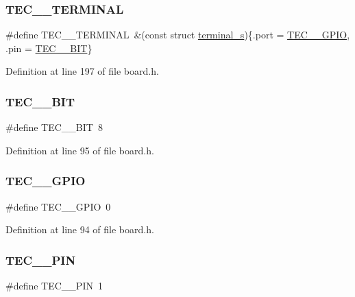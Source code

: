 \subsubsection{\texorpdfstring{T\+E\+C\+\_\+\_\+\+T\+E\+R\+M\+I\+N\+AL}{TEC\_1\_TERMINAL}}
{\footnotesize\ttfamily \#define T\+E\+C\+\_\+\_\+\+T\+E\+R\+M\+I\+N\+AL~\&(const struct \hyperlink{structterminal__s}{terminal\+\_\+s})\{.port = \hyperlink{group__samples_ga8731b2048404c4c819291bebfc6a1e6a}{T\+E\+C\+\_\+\_\+\+G\+P\+IO}, .pin = \hyperlink{group__samples_ga0f27cf5eeffd9d5f04a6a4c57bbdbae7}{T\+E\+C\+\_\+\_\+\+B\+IT}\}}



Definition at line 197 of file board.\+h.

\mbox{\label{group__hal_gaed7549a304721e36693036c8a289ff4c}} 
\subsubsection{\texorpdfstring{T\+E\+C\+\_\+\_\+\+B\+IT}{TEC\_2\_BIT}}
{\footnotesize\ttfamily \#define T\+E\+C\+\_\+\_\+\+B\+IT~8}



Definition at line 95 of file board.\+h.

\mbox{\label{group__hal_ga83ce1f0ab51ee7b4df55e629cdfc52d9}} 
\subsubsection{\texorpdfstring{T\+E\+C\+\_\+\_\+\+G\+P\+IO}{TEC\_2\_GPIO}}
{\footnotesize\ttfamily \#define T\+E\+C\+\_\+\_\+\+G\+P\+IO~0}



Definition at line 94 of file board.\+h.

\mbox{\label{group__hal_gae23ce57ac09e13a68a782d5bb61c8a30}} 
\subsubsection{\texorpdfstring{T\+E\+C\+\_\+\_\+\+P\+IN}{TEC\_2\_PIN}}
{\footnotesize\ttfamily \#define T\+E\+C\+\_\+\_\+\+P\+IN~1}



